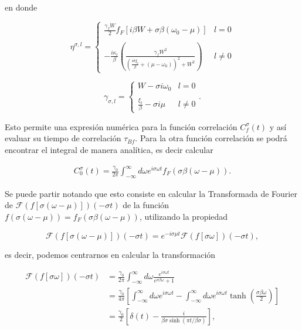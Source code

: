 \begin{appendixs}
en donde 

\begin{equation*}
    \eta^{\sigma,l} = \left\{ \begin{array}{lc} \frac{\gamma_{f}W}{2} f_{F}[i\beta W + \sigma \beta (\omega_{0}-\mu)]  & l = 0 \\ \\ - \frac{i\kappa_{l}}{\beta} \left(\frac{\gamma_{f}W^{2}}{ (\frac{i\sigma \xi_{l}}{\beta} + (\mu-\omega_{0}))^{2} + W^{2} } \right) &  l \neq 0 \end{array} \right.
\end{equation*}

\begin{equation*}
    \gamma_{\sigma,l} =  \left\{ \begin{array}{lc} W- \sigma i \omega_{0}  & l = 0 \\ \\ \frac{\xi_{l}}{\beta} - \sigma i \mu &  l \neq 0 \end{array} \right..
\end{equation*}

Esto permite una expresión numérica para la función correlación $C^{\sigma}_{f}(t)$ y así evaluar su tiempo de correlación $\tau_{Bf}$. Para la otra función correlación se podrá encontrar el integral de manera analítica, es decir calcular

\begin{align*}
       C_{0}^{\sigma}(t) = \frac{\gamma_{0}}{2\pi} \int_{-\infty}^{\infty} d\omega e^{i\sigma \omega t }f_{F}(\sigma \beta (\omega -  \mu)).
\end{align*}    

Se puede partir notando que esto consiste en calcular la Transformada de Fourier de $\mathcal{F}(f[\sigma (\omega - \mu)])(-\sigma t)$ de la función $f(\sigma(\omega-\mu))= f_{F}(\sigma \beta (\omega-\mu) )$, utilizando la propiedad

\begin{equation*}
\mathcal{F}(f[\sigma (\omega - \mu)])(-\sigma t) = e^{-i \sigma \mu t}\mathcal{F}(f[\sigma \omega])(-\sigma t),
\end{equation*}

es decir, podemos centrarnos en calcular la transformación

\begin{align*}
    \mathcal{F}(f[\sigma \omega])(-\sigma t) &= \frac{\gamma_{0}}{2\pi} \int_{-\infty}^{\infty} d\omega \frac{e^{i\sigma \omega t}}{e^{\sigma \beta \omega} +1 } \\
        & = \frac{\gamma_{0}}{4\pi} \left[\int_{-\infty}^{\infty}d \omega e^{i\sigma \omega t} - \int_{-\infty}^{\infty}d\omega e^{i\sigma \omega t} \tanh \left(\frac{ \sigma \beta \omega }{2} \right)   \right] \\
        & =  \frac{\gamma_{0}}{2} \left[\delta(t) - \frac{i}{\beta \sigma \sinh(\pi t/\beta \sigma)} \right],
\end{align*}


\end{appendixs}
